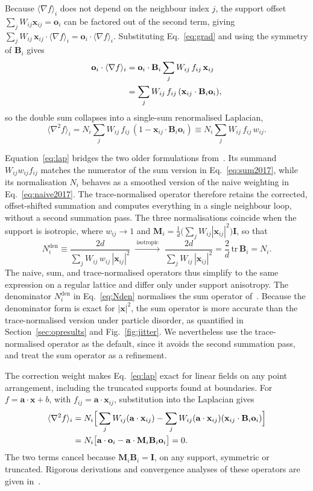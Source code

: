 \documentclass[preprint,review,12pt]{elsarticle}
\newcommand{\xij}{\mathbf{x}_{ij}}
\newcommand{\Mi}{\mathbf{M}_i}
\newcommand{\Bi}{\mathbf{B}_i}
\newcommand{\oi}{\mathbf{o}_i}
\newcommand{\lap}[1]{\langle\nabla^2 #1\rangle}
\newcommand{\gradop}[1]{\langle\nabla #1\rangle}
\begin{document}
Because $\gradop{f}_i$ does not depend on the neighbour index $j$, the support offset $\sum_j W_{ij}\xij=\oi$ can be factored out of the second term, giving $\sum_j W_{ij}\,\xij\cdot\gradop{f}_i=\oi\cdot\gradop{f}_i$.
Substituting Eq.~\eqref{eq:grad} and using the symmetry of $\Bi$ gives
\begin{align}
  \oi\cdot\gradop{f}_i
  &=\oi\cdot\Bi\sum_j W_{ij}\,f_{ij}\,\xij \notag\\
  &=\sum_j W_{ij}\,f_{ij}\,(\xij\cdot\Bi\oi),
  \label{eq:collapse}
\end{align}
so the double sum collapses into a single-sum renormalised Laplacian,
\begin{equation}
  \lap{f}_i=N_i\sum_j W_{ij}\,f_{ij}\,(1-\xij\cdot\Bi\oi)
           \equiv N_i\sum_j W_{ij}\,f_{ij}\,w_{ij}.
  \label{eq:lap}
\end{equation}

Equation~\eqref{eq:lap} bridges the two older formulations from~\cite{Basic2018}.
Its summand $W_{ij}w_{ij}f_{ij}$ matches the numerator of the sum version in Eq.~\eqref{eq:sum2017}, while its normalisation $N_i$ behaves as a smoothed version of the naive weighting in Eq.~\eqref{eq:naive2017}.
The trace-normalised operator therefore retains the corrected, offset-shifted summation and computes everything in a single neighbour loop, without a second summation pass.
The three normalisations coincide when the support is isotropic, where $w_{ij}\to1$ and $\Mi=\tfrac1d\big(\sum_j W_{ij}|\xij|^2\big)\mathbf I$, so that
\begin{equation}
  N_i^{\mathrm{den}}\equiv\frac{2d}{\sum_j W_{ij}\,w_{ij}\,|\xij|^2}
  \;\xrightarrow{\ \text{isotropic}\ }\;
  \frac{2d}{\sum_j W_{ij}\,|\xij|^2}=\frac{2}{d}\,\mathrm{tr}\,\Bi=N_i.
  \label{eq:Nden}
\end{equation}
The naive, sum, and trace-normalised operators thus simplify to the same expression on a regular lattice and differ only under support anisotropy.
The denominator $N_i^{\mathrm{den}}$ in Eq.~\eqref{eq:Nden} normalises the sum operator of~\cite{Basic2018}.
Because the denominator form is exact for $|\mathbf x|^2$, the sum operator is more accurate than the trace-normalised version under particle disorder, as quantified in Section~\ref{sec:opresults} and Fig.~\ref{fig:jitter}.
We nevertheless use the trace-normalised operator as the default, since it avoids the second summation pass, and treat the sum operator as a refinement.

The correction weight makes Eq.~\eqref{eq:lap} exact for linear fields on any point arrangement, including the truncated supports found at boundaries.
For $f=\mathbf a\cdot\mathbf x+b$, with $f_{ij}=\mathbf a\cdot\xij$, substitution into the Laplacian gives
\begin{align}
  \lap{f}_i
  &=N_i\Big[\sum_j W_{ij}(\mathbf a\cdot\xij)-\sum_j W_{ij}(\mathbf a\cdot\xij)(\xij\cdot\Bi\oi)\Big] \notag\\
  &=N_i\big[\mathbf a\cdot\oi-\mathbf a\cdot\Mi\Bi\oi\big]=0.
  \label{eq:lapconsist}
\end{align}
The two terms cancel because $\Mi\Bi=\mathbf I$, on any support, symmetric or truncated.
Rigorous derivations and convergence analyses of these operators are given in~\cite{Basic2018,Lanson2008a,Vila1999}.
\end{document}
